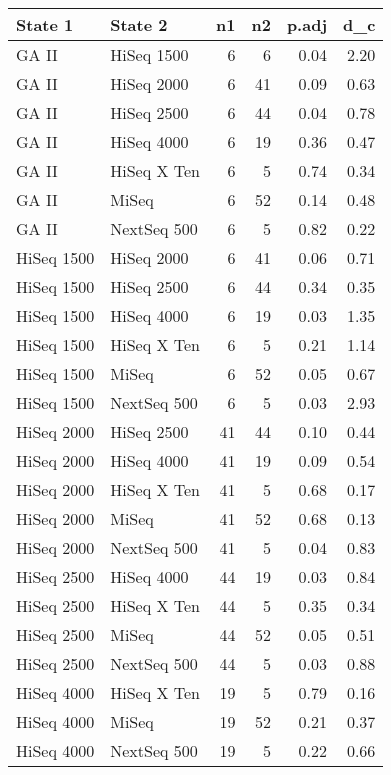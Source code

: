 \begin{table}[ht]
\centering
\begin{tabular}{llrrrr}
  \hline
State 1 & State 2 & n1 & n2 & p.adj & d\_c \\ 
  \hline
GA II & HiSeq 1500 &   6 &   6 & 0.04 & 2.20 \\ 
  GA II & HiSeq 2000 &   6 &  41 & 0.09 & 0.63 \\ 
  GA II & HiSeq 2500 &   6 &  44 & 0.04 & 0.78 \\ 
  GA II & HiSeq 4000 &   6 &  19 & 0.36 & 0.47 \\ 
  GA II & HiSeq X Ten &   6 &   5 & 0.74 & 0.34 \\ 
  GA II & MiSeq &   6 &  52 & 0.14 & 0.48 \\ 
  GA II & NextSeq 500 &   6 &   5 & 0.82 & 0.22 \\ 
  HiSeq 1500 & HiSeq 2000 &   6 &  41 & 0.06 & 0.71 \\ 
  HiSeq 1500 & HiSeq 2500 &   6 &  44 & 0.34 & 0.35 \\ 
  HiSeq 1500 & HiSeq 4000 &   6 &  19 & 0.03 & 1.35 \\ 
  HiSeq 1500 & HiSeq X Ten &   6 &   5 & 0.21 & 1.14 \\ 
  HiSeq 1500 & MiSeq &   6 &  52 & 0.05 & 0.67 \\ 
  HiSeq 1500 & NextSeq 500 &   6 &   5 & 0.03 & 2.93 \\ 
  HiSeq 2000 & HiSeq 2500 &  41 &  44 & 0.10 & 0.44 \\ 
  HiSeq 2000 & HiSeq 4000 &  41 &  19 & 0.09 & 0.54 \\ 
  HiSeq 2000 & HiSeq X Ten &  41 &   5 & 0.68 & 0.17 \\ 
  HiSeq 2000 & MiSeq &  41 &  52 & 0.68 & 0.13 \\ 
  HiSeq 2000 & NextSeq 500 &  41 &   5 & 0.04 & 0.83 \\ 
  HiSeq 2500 & HiSeq 4000 &  44 &  19 & 0.03 & 0.84 \\ 
  HiSeq 2500 & HiSeq X Ten &  44 &   5 & 0.35 & 0.34 \\ 
  HiSeq 2500 & MiSeq &  44 &  52 & 0.05 & 0.51 \\ 
  HiSeq 2500 & NextSeq 500 &  44 &   5 & 0.03 & 0.88 \\ 
  HiSeq 4000 & HiSeq X Ten &  19 &   5 & 0.79 & 0.16 \\ 
  HiSeq 4000 & MiSeq &  19 &  52 & 0.21 & 0.37 \\ 
  HiSeq 4000 & NextSeq 500 &  19 &   5 & 0.22 & 0.66 \\ 

\end{tabular}
\end{table}
